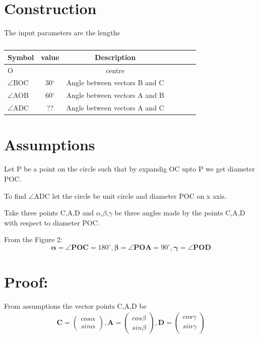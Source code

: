 \documentclass[journal,10pt,twocolumn]{article}
\let\vec\mathbf
\newcommand{\myvec}[1]{\ensuremath{\begin{pmatrix}#1\end{pmatrix}}}
\begin{document}
{\section*{\large Construction}



The input parameters are the lengths



\begin{table}[htbp]
 \begin{center}
    \begin{tabular}{|l|c|c|c|c|c|c} \hline \textbf{Symbol}
  & \textbf{value} & \textbf{Description} \\
 \hline
O & & centre \\ \hline
$\angle$BOC &30$^\circ$ & Angle between vectors B and C  \\ \hline
$\angle$AOB&60$^\circ$&Angle between vectors A and B\\
	\hline
	$\angle$ADC&??&Angle between vectors A and C \\
	\hline
\end{tabular}   
\end{center}
\caption{\label{table:dummytable} }
\end{table}

\vspace*{10mm}

\section*{\large Assumptions}
Let P be a point on the circle such that by expandig OC upto P we get diameter POC.



To find $\angle$ADC let the circle be unit circle and diameter POC on x axis.
\vspace*{3mm}

Take three points C,A,D  and $\alpha$,$\beta$,$\gamma$ be three angles made by the points C,A,D with respect to diameter POC.
\vspace*{3mm}

From the Figure 2:
\begin{equation}
\vec{\alpha} = \vec{\angle POC}= 180^\circ, 
\vec{\beta} = \vec{\angle POA} = 90^\circ,
\vec{\gamma} = \vec{\angle POD}
\end{equation}
 
\section*{Proof:}
From assumptions the vector points C,A,D be
\begin{eqnarray}
	\vec{C} = \myvec{cos\alpha\\sin\alpha},
	\vec{A} = \myvec{cos\beta\\sin\beta},
	\vec{D} = \myvec{cos\gamma\\sin\gamma}
\end{eqnarray}

}
\end{document}
